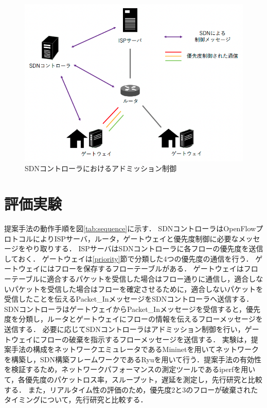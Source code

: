\documentclass[a4paper,10pt,twocolumn,uplatex]{jsarticle}
\begin{document}
\begin{figure}[t]
	\begin{centering}
    \includegraphics[width=0.75\linewidth]{img/proposal.png}
    \caption{SDNコントローラにおけるアドミッション制御}
    \label{tab:adomission}
    \end{centering}
\end{figure}

\section{評価実験}
提案手法の動作手順を図\ref{tab:sequence}に示す．
SDNコントローラはOpenFlowプロトコルによりISPサーバ，ルータ，ゲートウェイと優先度制御に必要なメッセージをやり取りする．
ISPサーバはSDNコントローラに各フローの優先度を送信しておく．
ゲートウェイは\ref{priority}節で分類した4つの優先度の通信を行う．
ゲートウェイにはフローを保存するフローテーブルがある．
ゲートウェイはフローテーブルに適合するパケットを受信した場合はフロー通りに通信し，適合しないパケットを受信した場合はフローを確定させるために，適合しないパケットを受信したことを伝えるPacket\_InメッセージをSDNコントローラへ送信する．
SDNコントローラはゲートウェイからPacket\_Inメッセージを受信すると，優先度を分類し，ルータとゲートウェイにフローの情報を伝えるフローメッセージを送信する．
必要に応じてSDNコントローラはアドミッション制御を行い，ゲートウェイにフローの破棄を指示するフローメッセージを送信する．
実験は，提案手法の構成をネットワークエミュレータであるMininetを用いてネットワークを構築し，SDN構築フレームワークであるRyuを用いて行う．提案手法の有効性を検証するため，ネットワークパフォーマンスの測定ツールであるiperfを用いて，各優先度のパケットロス率，スループット，遅延を測定し，先行研究と比較する．
また，リアルタイム性の評価のため，優先度2と3のフローが破棄されたタイミングについて，先行研究と比較する．
\end{document}
